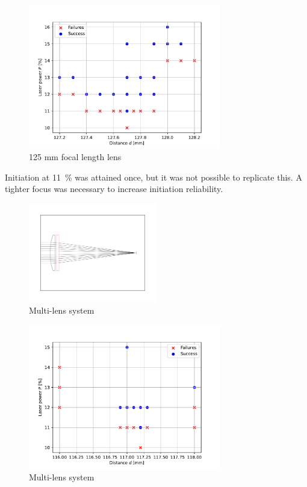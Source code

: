             \begin{figure}[!ht]
                \centering
                \includegraphics[width=0.75\textwidth]{assets/4 experiments/125mm_focus_threshold.pdf}
                \caption{125 mm focal length lens}
            \end{figure}
            
            Initiation at \qty{11}{\%} was attained once, but it was not possible to replicate this. A tighter focus was necessary to increase initiation reliability.

            \begin{figure}[!ht]
                \centering
                \includegraphics[width=0.5\textwidth]{assets/4 experiments/500 and 150 lenses.pdf}
                \caption{Multi-lens system}
            \end{figure}

            \begin{figure}[!ht]
                \centering
                \includegraphics[width=0.75\textwidth]{assets/4 experiments/duallens_focus_threshold.pdf}
                \caption{Multi-lens system}
            \end{figure}

